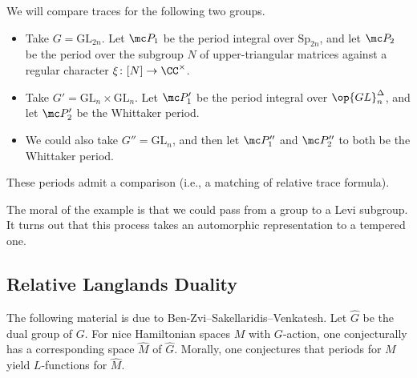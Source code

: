 \documentclass{article}
\begin{document}
\begin{example} \label{ex:rtf-comparison}
	We will compare traces for the following two groups.
	\begin{itemize}
		\item Take $G=\mathrm{GL}_{2n}$. Let $\mc P_1$ be the period integral over $\mathrm{Sp}_{2n}$, and let $\mc P_2$ be the period over the subgroup $N$ of upper-triangular matrices against a regular character $\xi\colon[N]\to\CC^\times$.
		\item Take $G'=\mathrm{GL}_n\times\mathrm{GL}_n$. Let $\mc P_1'$ be the period integral over $\op{GL}_n^\Delta$, and let $\mc P_2'$ be the Whittaker period.
		\item We could also take $G''=\mathrm{GL}_n$, and then let $\mc P_1''$ and $\mc P_2''$ to both be the Whittaker period.
	\end{itemize}
	These periods admit a comparison (i.e., a matching of relative trace formula).
\end{example}
The moral of the example is that we could pass from a group to a Levi subgroup. It turns out that this process takes an automorphic representation to a tempered one.

\subsection{Relative Langlands Duality}
The following material is due to Ben-Zvi--Sakellaridis--Venkatesh. Let $\widehat G$ be the dual group of $G$. For nice Hamiltonian spaces $M$ with $G$-action, one conjecturally has a corresponding space $\widehat M$ of $\widehat G$. Morally, one conjectures that periods for $M$ yield $L$-functions for $\widehat M$.
\end{document}
